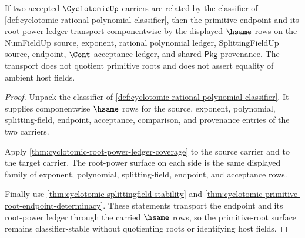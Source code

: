 \begin{theorem}
\label{thm:cyclotomic-primitive-endpoint-classifier-stability}
If two accepted $\CyclotomicUp$ carriers are related by the classifier of
\autoref{def:cyclotomic-rational-polynomial-classifier}, then the primitive
endpoint and its root-power ledger transport componentwise by the displayed
$\hsame$ rows on the NumFieldUp source, exponent, rational polynomial ledger,
SplittingFieldUp source, endpoint, $\Cont$ acceptance ledger, and shared
$\mathsf{Pkg}$ provenance. The transport does not quotient primitive roots
and does not assert equality of ambient host fields.
\end{theorem}
\begin{proof}
Unpack the classifier of
\autoref{def:cyclotomic-rational-polynomial-classifier}. It supplies
componentwise $\hsame$ rows for the source, exponent, polynomial,
splitting-field, endpoint, acceptance, comparison, and provenance entries of
the two carriers.

Apply \autoref{thm:cyclotomic-root-power-ledger-coverage} to the source
carrier and to the target carrier. The root-power surface on each side is the
same displayed family of exponent, polynomial, splitting-field, endpoint, and
acceptance rows.

Finally use \autoref{thm:cyclotomic-splittingfield-stability} and
\autoref{thm:cyclotomic-primitive-root-endpoint-determinacy}. These
statements transport the endpoint and its root-power ledger through the
carried $\hsame$ rows, so the primitive-root surface remains classifier-stable
without quotienting roots or identifying host fields.
\end{proof}

